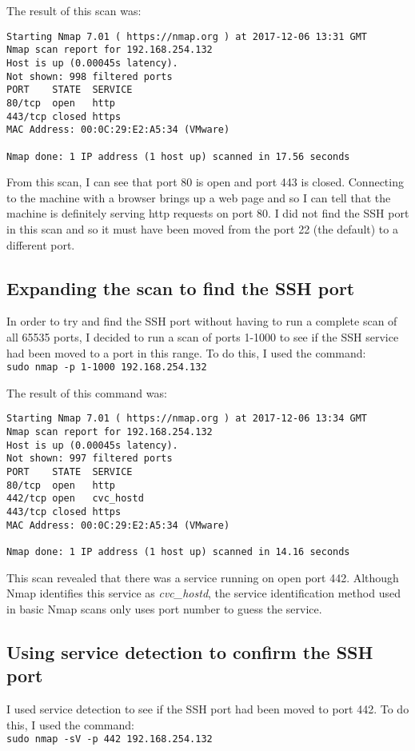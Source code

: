 \documentclass[12pt]{report}
\newcommand{\term}[1]{\colorbox{light-gray}{\texttt{#1}}}
\begin{document}
The result of this scan was:
\begin{Verbatim}
Starting Nmap 7.01 ( https://nmap.org ) at 2017-12-06 13:31 GMT
Nmap scan report for 192.168.254.132
Host is up (0.00045s latency).
Not shown: 998 filtered ports
PORT    STATE  SERVICE
80/tcp  open   http
443/tcp closed https
MAC Address: 00:0C:29:E2:A5:34 (VMware)

Nmap done: 1 IP address (1 host up) scanned in 17.56 seconds
\end{Verbatim}

From this scan, I can see that port 80 is open and port 443 is closed. Connecting to the machine with a browser brings up a web page and so I can tell that the machine is definitely serving http requests on port 80. I did not find the SSH port in this scan and so it must have been moved from the port 22 (the default) to a different port.

\subsection{Expanding the scan to find the SSH port}
In order to try and find the SSH port without having to run a complete scan of all 65535 ports, I decided to run a scan of ports 1-1000 to see if the SSH service had been moved to a port in this range. To do this, I used the command:\\
\term{sudo nmap -p 1-1000 192.168.254.132}

The result of this command was:
\begin{Verbatim}
Starting Nmap 7.01 ( https://nmap.org ) at 2017-12-06 13:34 GMT
Nmap scan report for 192.168.254.132
Host is up (0.00045s latency).
Not shown: 997 filtered ports
PORT    STATE  SERVICE
80/tcp  open   http
442/tcp open   cvc_hostd
443/tcp closed https
MAC Address: 00:0C:29:E2:A5:34 (VMware)

Nmap done: 1 IP address (1 host up) scanned in 14.16 seconds
\end{Verbatim}

This scan revealed that there was a service running on open port 442. Although Nmap identifies this service as \textit{cvc\_hostd}, the service identification method used in basic Nmap scans only uses port number to guess the service.

\subsection{Using service detection to confirm the SSH port}
I used service detection to see if the SSH port had been moved to port 442. To do this, I used the command:\\
\term{sudo nmap -sV -p 442 192.168.254.132}
\end{document}
